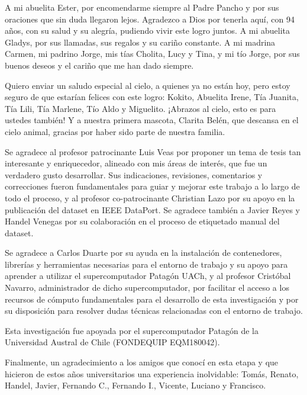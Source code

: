 \documentclass[runningheads]{llncs}
\begin{document}
A mi abuelita Ester, por encomendarme siempre al Padre Pancho y por sus 
oraciones que sin duda llegaron lejos. Agradezco a Dios por tenerla 
aquí, con 94 años, con su salud y su alegría, pudiendo vivir este logro 
juntos. A mi abuelita Gladys, por sus llamadas, sus regalos y su cariño 
constante. A mi madrina Carmen, mi padrino Jorge, mis tías Cholita, 
Lucy y Tina, y mi tío Jorge, por sus buenos deseos y el cariño que me 
han dado siempre.

Quiero enviar un saludo especial al cielo, a quienes ya no están hoy, 
pero estoy seguro de que estarían felices con este logro: Kokito, 
Abuelita Irene, Tía Juanita, Tía Lili, Tía Marlene, Tío Aldo y 
Miguelito. ¡Abrazos al cielo, esto es para ustedes también! Y a nuestra 
primera mascota, Clarita Belén, que descansa en el cielo animal, 
gracias por haber sido parte de nuestra familia.

Se agradece al profesor patrocinante Luis Veas por proponer un tema de 
tesis tan interesante y enriquecedor, alineado con mis áreas de interés, 
que fue un verdadero gusto desarrollar. Sus indicaciones, revisiones, 
comentarios y correcciones fueron fundamentales para guiar y mejorar 
este trabajo a lo largo de todo el proceso, y al profesor 
co-patrocinante Christian Lazo por su apoyo en la publicación del 
dataset en IEEE DataPort. Se agradece también a Javier Reyes y Handel 
Venegas por su colaboración en el proceso de etiquetado manual del dataset.

Se agradece a Carlos Duarte por su ayuda en la instalación de 
contenedores, librerías y herramientas necesarias para el entorno de 
trabajo y su apoyo para aprender a utilizar el supercomputador 
Patagón UACh, y al profesor Cristóbal Navarro, administrador de dicho 
supercomputador, por facilitar el acceso a los recursos de cómputo 
fundamentales para el desarrollo de esta investigación y por su 
disposición para resolver dudas técnicas relacionadas con el entorno 
de trabajo.

Esta investigación fue apoyada por el supercomputador Patagón de la 
Universidad Austral de Chile (FONDEQUIP EQM180042).

Finalmente, un agradecimiento a los amigos que conocí en esta etapa 
y que hicieron de estos años universitarios una experiencia 
inolvidable: Tomás, Renato, Handel, Javier, Fernando C., Fernando I., 
Vicente, Luciano y Francisco.





\end{document}
